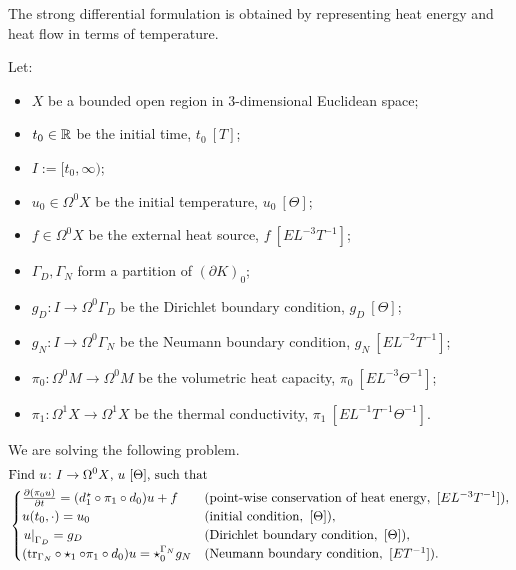 \begin{formulation}
  \label{idec/continuous_heat_transport/strong-formulation}
  The strong differential formulation is obtained by representing heat energy
  and heat flow in terms of temperature.

  Let:
  \begin{itemize}
    \item
      $X$ be a bounded open region in $3$-dimensional Euclidean space;
    \item
      $t_0 \in \mathbb{R}$ be the initial time, $t_0\ [T]$;
    \item
      $I := [t_0, \infty)$;
    \item
      $u_0 \in \Omega^0 X$ be the initial temperature, $u_0\ [\Theta]$;
    \item
      $f \in \Omega^0 X$ be the external heat source, $f\ [E L^{-3} T^{-1}]$;
    \item
      $\Gamma_D, \Gamma_N$ form a partition of $(\partial K)_0$;
    \item
      $g_D \colon I \to \Omega^0 \Gamma_D$
      be the Dirichlet boundary condition, $g_D\ [\Theta]$;
    \item
      $g_N \colon I \to \Omega^0 \Gamma_N$
      be the Neumann boundary condition, $g_N\ [E L^{-2} T^{-1}]$;
    \item
      $\pi_0 \colon \Omega^0 M \to \Omega^0 M$ be the volumetric heat capacity,
      $\pi_0\ [E L^{-3} \Theta^{-1}]$;
    \item
      $\pi_1 \colon \Omega^1 X \to \Omega^1 X$ be the thermal conductivity,
      $\pi_1\ [E L^{-1} T^{-1} \Theta^{-1}]$.
  \end{itemize}
  We are solving the following problem.
  \begin{equation}
    \begin{split}
      & \text{Find $u \colon I \to \Omega^0 X$, $u\ [\Theta]$, such that} \\
      &
      \begin{cases}
        \frac{\partial (\pi_0 u)}{\partial t} =
        (d_1^\star \circ \pi_1 \circ d_0) u + f
        & (\text{point-wise conservation of heat energy},
          \ [E L^{-3} T^{-1}]), \\
%
        u(t_0, \cdot) = u_0
        & (\text{initial condition},\ [\Theta]), \\
%
        \restrict{u}{\Gamma_D} = g_D
        & (\text{Dirichlet boundary condition},\ [\Theta]), \\
%
        (\tr_{\Gamma_N} \circ \star_1\circ \pi_1 \circ d_0) u
        = \star^{\Gamma_N}_0 g_N
        & (\text{Neumann boundary condition},\ [E T^{-1}]).
      \end{cases}
    \end{split}
  \end{equation}
\end{formulation}
